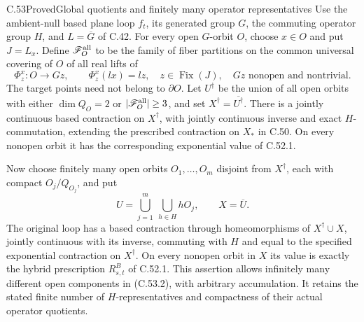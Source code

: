 \begin{claim}{C.53}{Proved}{Global quotients and finitely many operator representatives}
Use the ambient-null based plane loop $f_t$, its generated group
$G$, the commuting operator group $H$, and $L=\overline G$ of
C.42. For every open $G$-orbit $O$, choose $x\in O$ and
put $J=L_x$. Define $\mathscr F_O^{\rm all}$ to be the family
of fiber partitions on the common universal covering of $O$
of all real lifts of
\[
 \Phi_z^x:O\longrightarrow Gz,\qquad \Phi_z^x(lx)=lz,
 \quad z\in\operatorname{Fix}(J),\quad
                  Gz\text{ nonopen and nontrivial}.
                                                        \tag{C.53.1}
\]
The target points need not belong to $\partial O$.
Let $U^\dagger$ be the union of all open orbits with either
$\dim Q_O=2$ or $|\mathscr F_O^{\rm all}|\geq3$, and set
$X^\dagger=\overline{U^\dagger}$.
There is a jointly continuous based contraction on
$X^\dagger$, with jointly continuous inverse and exact
$H$-commutation, extending the prescribed contraction on
$X_*$ in C.50. On every nonopen orbit it has the
corresponding exponential value of C.52.1.

Now choose finitely many open orbits
$O_1,\ldots,O_m$ disjoint from $X^\dagger$, each with compact
$O_j/Q_{O_j}$, and put
\[
 U=\bigcup_{j=1}^m\ \bigcup_{h\in H}hO_j,
 \qquad X=\overline U.
                                                        \tag{C.53.2}
\]
The original loop has a based contraction through
homeomorphisms of $X^\dagger\cup X$, jointly continuous
with its inverse, commuting with $H$ and equal to the
specified exponential contraction on $X^\dagger$.
On every nonopen orbit in $X$ its value is exactly the
hybrid prescription $R^B_{s,t}$ of C.52.1.
This assertion allows infinitely many different open
components in (C.53.2), with arbitrary accumulation.
It retains the stated finite number of $H$-representatives
and compactness of their actual operator quotients.
\end{claim}


